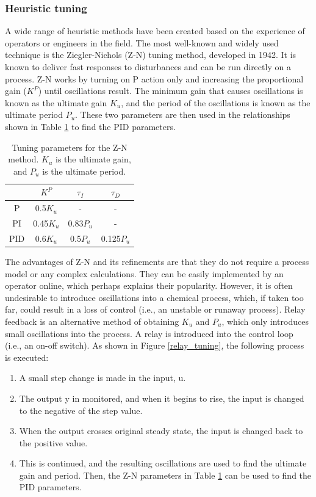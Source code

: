 \subsubsection{Heuristic tuning}
A wide range of heuristic methods have been created based on the experience of operators or engineers in the field. The most well-known and widely used technique is the Ziegler-Nichols (Z-N) tuning method, developed in 1942.\citep{Ziegler1942} It is known to deliver fast responses to disturbances and can be run directly on a process.\citep{Riggs2006} Z-N works by turning on P action only and increasing the proportional gain ($K^P$) until oscillations result. The minimum gain that causes oscillations is known as the ultimate gain $K_u$, and the period of the oscillations is known as the ultimate period $P_u$. These two parameters are then used in the relationships shown in Table \ref{table:ZN_parameters} to find the PID parameters.

\begin{table}[b]
	\centering
	\caption{Tuning parameters for the Z-N method. $K_u$ is the ultimate gain, and $P_u$ is the ultimate period.}
	\label{table:ZN_parameters}
	\begin{tabular}{ c c c c }
	& $K^P$ & $\tau_I$ & $\tau_D$ \\
	\hline
	P & 0.5$K_u$ & - & - \\
	PI & 0.45$K_u$ & 0.83$P_u$ & - \\
	PID & 0.6$K_u$ & 0.5$P_u$ & 0.125$P_u$ \\
	\end{tabular}
\end{table}

The advantages of Z-N and its refinements\citep{Hang1991} are that they do not require a process model or any complex calculations. They can be easily implemented by an operator online, which perhaps explains their popularity.\citep{KiamHeongAng2005} However, it is often undesirable to introduce oscillations into a chemical process, which, if taken too far, could result in a loss of control (i.e., an unstable or runaway process). Relay feedback is an alternative method of obtaining $K_u$ and $P_u$, which only introduces small oscillations into the process.\citep{Shen1994} A relay is introduced into the control loop (i.e., an on-off switch).  As shown in Figure \ref{relay_tuning}, the following process is executed: 
\begin{enumerate}
    \item A small step change is made in the input, u.
    \item The output y in monitored, and when it begins to rise, the input is changed to the negative of the step value.
    \item When the output crosses original steady state, the input is changed back to the positive value.
    \item 	This is continued, and the resulting oscillations are used to find the ultimate gain and period. Then, the Z-N parameters in Table \ref{table:ZN_parameters} can be used to find the PID parameters. 
\end{enumerate}

